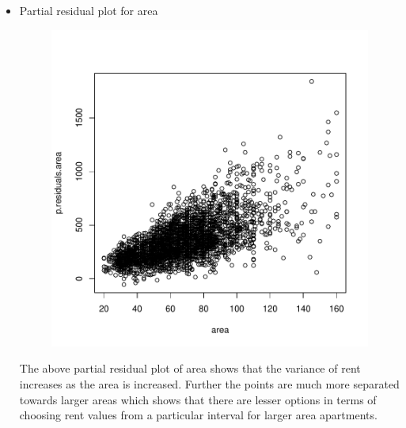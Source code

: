 \documentclass[12pt]{article}
\begin{document}
\begin{itemize}
\item Partial residual plot for area
\begin{figure}[H]
\begin{Schunk}
\end{Schunk}
\includegraphics{HW3-033}
\end{figure}
\clearpage

The above partial residual plot of area shows that the variance of rent increases as the area is increased. Further the points are much more separated towards larger areas which shows that there are lesser options in terms of choosing rent values from a particular interval for larger area apartments.  


\end{itemize}
\end{document}
